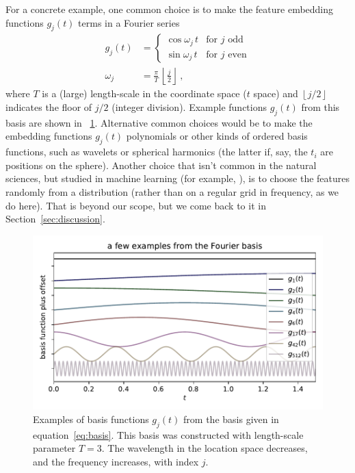 \documentclass[12pt,letterpaper]{article}
\newlength{\figurewidth}
\newcommand{\floor}[1]{\left\lfloor #1 \right\rfloor}
\newcommand{\sectionname}{Section}
\begin{document}
For a concrete example, one common choice is to make the feature embedding functions $g_j(t)$ terms in a Fourier series
\begin{align}\label{eq:basis}
    g_j(t) &= \left\{\begin{array}{ll}
            \cos\omega_j\,t & \mbox{for $j$ odd} \\
            \sin\omega_j\,t & \mbox{for $j$ even}\end{array}\right.
    \\
    \omega_j &= \frac{\pi}{T}\,\floor{\frac{j}{2}}
    ~,
\end{align}
where $T$ is a (large) length-scale in the coordinate space ($t$ space) and $\floor{j/2}$ indicates the floor of $j/2$ (integer division).
Example functions $g_j(t)$ from this basis are shown in \figurename~\ref{fig:basis}.
Alternative common choices would be to make the embedding functions $g_j(t)$ polynomials or other kinds of ordered basis functions, such as wavelets or spherical harmonics (the latter if, say, the $t_i$ are positions on the sphere).
Another choice that isn't common in the natural sciences, but studied in machine learning (for example, \citealt{rahimi2007random}), is to choose the features randomly from a distribution (rather than on a regular grid in frequency, as we do here). That is beyond our scope, but we come back to it in \sectionname~\ref{sec:discussion}.
\begin{figure}[t]
    \begin{mdframed}
    \includegraphics[width=\figurewidth]{paper/fourier.pdf}
    \caption{Examples of basis functions $g_j(t)$ from the basis given in equation~\eqref{eq:basis}. This basis was constructed with length-scale parameter $T=3$. The wavelength in the location space decreases, and the frequency increases, with index $j$.}
    \label{fig:basis}
    \end{mdframed}
\end{figure}
\end{document}
